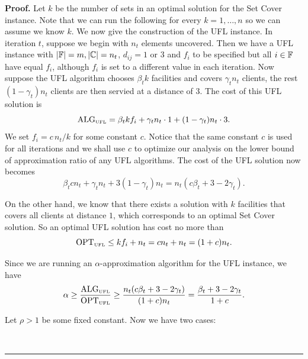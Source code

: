 \documentclass[oneside,final]{ucr}
\newenvironment{proof}[1][Proof]{\textbf{#1.} }{\ \rule{0.5em}{0.5em}}
\begin{document}
\begin{proof}
  Let $k$ be the number of sets in an optimal solution for the Set
  Cover instance. Note that we can run the following for every
  $k=1,\ldots,n$ so we can assume we know $k$.  We now give the
  construction of the UFL instance. In iteration $t$, suppose we begin
  with $n_t$ elements uncovered. Then we have a UFL instance with
  $|\mathbb{F}| = m, |\mathbb{C}| = n_t$, $d_{ij} = 1 \text{ or } 3$
  and $f_i$ to be specified but all $i\in\mathbb{F}$ have equal $f_i$,
  although $f_i$ is set to a different value in each iteration. Now
  suppose the UFL algorithm chooses $\beta_t k$ facilities and covers
  $\gamma_t n_t$ clients, the rest $(1-\gamma_t) n_t$ clients are then
  servied at a distance of $3$. The cost of this UFL solution is
\begin{equation*}
  \mbox{\rm ALG}_{\mbox{\tiny\rm UFL}} = \beta_t k f_i + \gamma_t n_t \cdot 1 + (1 -
  \gamma_t) n_t \cdot 3.
\end{equation*}
We set $f_i = c\,n_t / k$ for some constant $c$. Notice
that the same constant $c$ is used for all iterations and we
shall use $c$ to optimize our analysis on the lower bound of
approximation ratio of any UFL algorithms. The cost of the
UFL solution now becomes
\begin{equation*}
  \beta_t c n_t + \gamma_t n_t + 3 (1-\gamma_t) n_t = n_t
  (c\beta_t + 3 - 2\gamma_t).
\end{equation*}

On the other hand, we know that there exists a solution with
$k$ facilities that covers all clients at distance $1$,
which corresponds to an optimal Set Cover solution. So an
optimal UFL solution has cost no more than
\begin{equation*}
  \mbox{\rm OPT}_{\mbox{\tiny\rm UFL}} \leq k f_i + n_t = c n_t + n_t = (1+c)n_t.
\end{equation*}

Since we are running an $\alpha$-approximation algorithm for
the UFL instance, we have
\begin{equation*}
  \alpha \geq \frac{\mbox{\rm ALG}_{\mbox{\tiny\rm UFL}}}{\mbox{\rm OPT}_{\mbox{\tiny\rm UFL}}} \geq \frac{n_t
  (c\beta_t + 3 - 2\gamma_t)}{(1+c)n_t} = \frac{\beta_t + 3 -
2\gamma_t}{1+c}.
\end{equation*}

Let $\rho > 1$ be some fixed constant. Now we have two
cases:


\end{proof}
\end{document}
